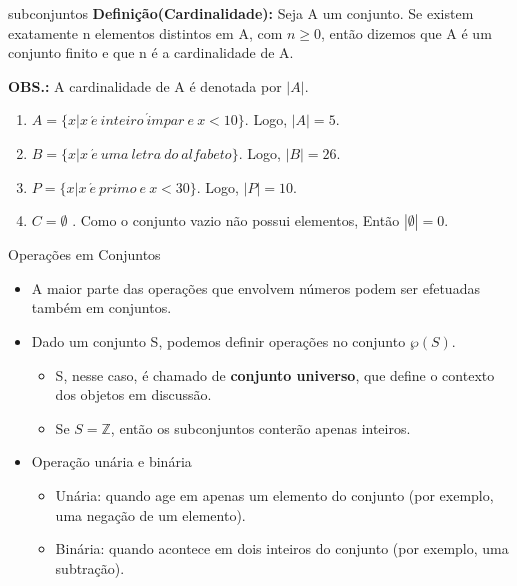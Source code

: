 \documentclass[aspectratio=169]{beamer}
\begin{document}
\begin{frame}{subconjuntos}
    \textbf{Definição(Cardinalidade):} Seja A um conjunto. Se existem exatamente n elementos distintos em A, com $n \geq 0$, então dizemos que A é um conjunto finito e que n é a cardinalidade de A.

    \vspace{4mm}
\textbf{OBS.:} A cardinalidade de A é denotada por $|A|$.

\vspace{4mm}

\begin{enumerate}
    \item $A = \{x | x ~ \acute{e} ~ inteiro ~ \acute{i}mpar ~ e ~ x < 10\}$. Logo, $|A| = 5$.
    \item $B = \{x | x ~ \acute{e}  ~ uma ~ letra ~ do ~ alfabeto\}$. Logo, $|B|= 26$.
    \item $P = \{x | x ~ \acute{e} ~ primo ~ e ~ x < 30\}$. Logo, $|P| = 10$.
    \item $C = \emptyset$ . Como o conjunto vazio não possui elementos, Então $|\emptyset | = 0$.
\end{enumerate}
\end{frame}

\begin{frame}{Operações em Conjuntos}
\begin{itemize}
    \item A maior parte das operações que envolvem números podem ser efetuadas também em conjuntos.
    \item Dado um conjunto S, podemos definir operações no conjunto $\wp(S)$.
    \begin{itemize}
        \item S, nesse caso, é chamado de \textbf{conjunto universo}, que define o contexto dos objetos em discussão.
        \item Se $S = \mathbb{Z}$, então os subconjuntos conterão apenas inteiros.
    \end{itemize}
    \item Operação unária e binária
    \begin{itemize}
        \item Unária: quando age em apenas um elemento do conjunto (por exemplo, uma negação de um elemento).
        \item Binária: quando acontece em dois inteiros do conjunto (por exemplo, uma subtração).
    \end{itemize}
\end{itemize}
\end{frame}
\end{document}
